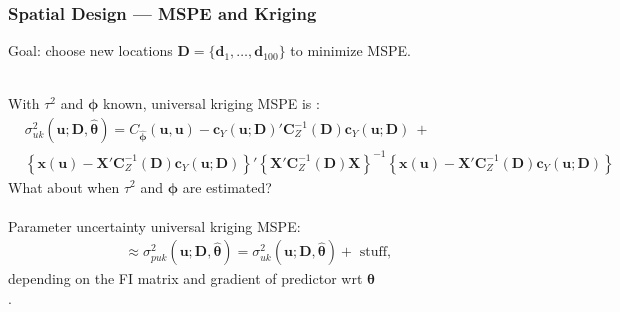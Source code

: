 \documentclass[xcolor=dvipsnames]{beamer}
\begin{document}
\begin{frame}
\frametitle{Spatial Design --- MSPE and Kriging}
Goal: choose new locations $\bm{D} = \{\bm{d}_1, \dots, \bm{d}_{100}\}$ to minimize MSPE. \\~\\

\pause

With $\tau^2$ and $\bm{\phi}$ known, universal kriging MSPE is {\footnotesize \citep*{cressie2011statistics}:}
{\footnotesize
\begin{align*}
& \sigma_{uk}^2(\bm{u};\bm{D}, \widehat{\bm{\theta}})=C_{\widehat{\bm{\phi}}}(\bm{u}, \bm{u}) - \bm{c}_Y(\bm{u};\bm{D})'\bm{C}_Z^{-1}(\bm{D})\bm{c}_Y(\bm{u};\bm{D}) \ + \\
& \left\{\bm{x}(\bm{u})  - \bm{X}'\bm{C}_Z^{-1}(\bm{D})\bm{c}_Y(\bm{u};\bm{D})\right\}'\left\{\bm{X}'\bm{C}_Z^{-1}(\bm{D})\bm{X}\right\}^{-1}\left\{\bm{x}(\bm{u})  - \bm{X}'\bm{C}_Z^{-1}(\bm{D})\bm{c}_Y(\bm{u};\bm{D})\right\}
\end{align*}
}
\pause
What about when $\tau^2$ and $\bm{\phi}$ are estimated? \pause\\~\\

Parameter uncertainty universal kriging MSPE:
\begin{align*}
\approx \sigma^2_{puk}(\bm{u};\bm{D},\widehat{\bm{\theta}}) = \sigma^2_{uk}(\bm{u};\bm{D},\widehat{\bm{\theta}}) + \mbox{ stuff, }
\end{align*}
depending on the FI matrix and gradient of predictor wrt $\bm{\theta}$\\
\citep*{zimmerman1992mean,abt1999estimating}.
\end{frame}
\end{document}
